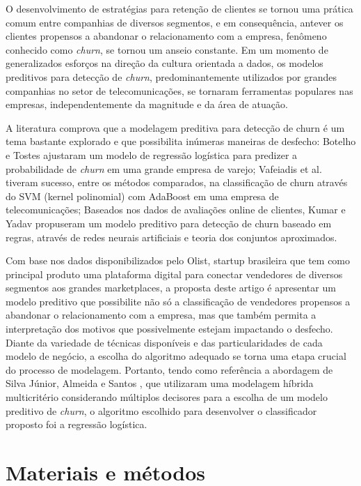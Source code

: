 \documentclass[twocolumn]{rbef}
\newcommand{\1}{\mathbbm{1}}
\begin{document}
O desenvolvimento de estratégias para retenção de clientes se tornou uma prática comum entre companhias de diversos segmentos, e em consequência, antever os clientes propensos a abandonar o relacionamento com a empresa, fenômeno conhecido como \textit{churn}, se tornou um anseio constante. Em um momento de generalizados esforços na direção da cultura orientada a dados, os modelos preditivos para detecção de \textit{churn}, predominantemente utilizados por grandes companhias no setor de telecomunicações, se tornaram ferramentas populares nas empresas, independentemente da magnitude e da área de atuação.

A literatura comprova que a modelagem preditiva para detecção de churn é um tema bastante explorado e que possibilita inúmeras maneiras de desfecho: Botelho e Tostes \cite{Botelho2010} ajustaram um modelo de regressão logística para predizer a probabilidade de \textit{churn} em uma grande empresa de varejo; Vafeiadis et al.~\cite{Vafeiadis2015} tiveram sucesso, entre os métodos comparados, na classificação de churn através do SVM (kernel polinomial) com AdaBoost em uma empresa de telecomunicações; Baseados nos dados de avaliações online de clientes, Kumar e Yadav \cite{Kumar2020} propuseram um modelo preditivo para detecção de churn baseado em regras, através de redes neurais artificiais e teoria dos conjuntos aproximados.

Com base nos dados disponibilizados pelo Olist, startup brasileira que tem como principal produto uma plataforma digital para conectar vendedores de diversos segmentos aos grandes marketplaces, a proposta deste artigo é apresentar um modelo preditivo que possibilite não só a classificação de vendedores propensos a abandonar o relacionamento com a empresa, mas que também permita a interpretação dos motivos que possivelmente estejam impactando o desfecho. Diante da variedade de técnicas disponíveis e das particularidades de cada modelo de negócio, a escolha do algoritmo adequado se torna uma etapa crucial do processo de modelagem. Portanto, tendo como referência a abordagem de Silva Júnior, Almeida e Santos \cite{Junior2020}, que utilizaram uma modelagem híbrida multicritério considerando múltiplos decisores para a escolha de um modelo preditivo de \textit{churn}, o algoritmo escolhido para desenvolver o classificador proposto foi a regressão logística.

\hypertarget{materiais-e-muxe9todos}{%
\section{Materiais e métodos}\label{materiais-e-muxe9todos}}
\end{document}
